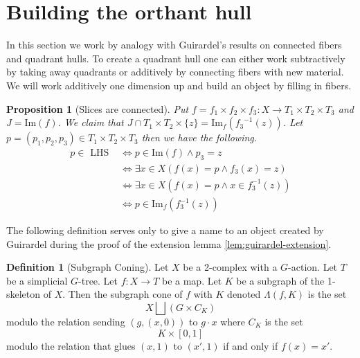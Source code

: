 \documentclass[12pt,parskip=full]{report}
\theoremstyle{plain}
\newtheorem{prop}[thm]{Proposition}
\theoremstyle{definition}
\newtheorem{dfn}[thm]{Definition}
\begin{document}


\section{Building the orthant hull}

In this section we work by analogy with Guirardel's results on connected fibers and quadrant hulls. To create a quadrant hull one can either work subtractively by taking away quadrants or additively by connecting fibers with new material. We will work additively one dimension up and build  an object by filling in fibers.


\begin{prop}
    [Slices are connected]
 \label{prop:fibershomeoplanes} 
    Put \(f =  f_{1} \times f_{2} \times f_{3}: X \to T_{1} \times T_{2} \times T_{3} \) and \(J = \text{Im}(f)\). We claim that \(J \cap T_{1} \times T_{2} \times \{z\} = \text{Im}_{f} ({ f_{3}}^{-1}(z))\). Let \(p = (p_{1}, p_{2} , p_{3}) \in T_{1} \times T_{2} \times T_{3}\) then we have the following. 
    \begin{align*}
        p \in \text { LHS } & \Longleftrightarrow p \in \text{Im}(f) \wedge p_{3} = z \\ 
        & \Longleftrightarrow \exists x \in X (f(x)=p \wedge  f_3(x)=z)\\
        & \Longleftrightarrow \exists x \in X (f(x)=p \wedge x \in f_3^{-1} (z))\\
        & \Longleftrightarrow p \in \text{Im}_f(f_3^{-1} (z))
    \end{align*}
\end{prop}

The following definition serves only to give a name to an object created by Guirardel during the proof of the extension lemma \ref{lem:guirardel-extension}.
\begin{dfn}
    [Subgraph Coning]
    \label{dfn:subgraphconing}
    Let \(X\) be a 2-complex with a \(G\)-action. Let \(T\) be a simplicial \(G\)-tree. Let \(f:X\to T\) be a map. Let \(K\) be a subgraph of the 1-skeleton of \(X\). Then the subgraph cone of \(f\) with \(K\) denoted \(\Lambda(f, K)\) is the set \[X \bigsqcup \left(G\times C_K\right)\] modulo the relation sending \((g, (x,0))\) to \(g\cdot x\) where \(C_K\) is the set \[ K\times [0,1]\] modulo the relation that glues \((x,1)\) to \((x', 1)\) if and only if \(f(x) = x'\). 
\end{dfn}
\end{document}

